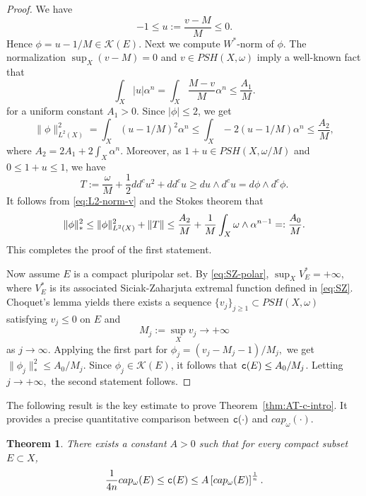 \documentclass{amsart}
\newcommand{\al}{\alpha}
\newcommand{\om}{\omega}
\newcommand{\tc}{{\tt c}}
\newcommand{\cali}[1]{\mathscr{#1}}
\newcommand{\Kc}{\cali{K}}
\newtheorem{thm}{Theorem}
\theoremstyle{definition}
\numberwithin{thm}{section}
\numberwithin{equation}{section}
\renewcommand{\[}{\begin{equation}}
\renewcommand{\]}{\end{equation}}
\newcommand{\wed}{\wedge}
\begin{document}
\begin{proof}  We have
$$
 	-1 \leq u:= \frac{v- M}{M}  \leq 0.
$$
Hence $\phi = u - 1/M \in \Kc(E)$.  Next we compute $W^*$-norm of $\phi$.  The normalization $\sup_X (v-M)  =0$ and $v\in PSH(X,\om)$ imply  a well-known fact that 
$$
	\int_X |u| \al^n = \int_X \frac{M-v}{M} \al^n\leq \frac{A_1}{M}.
$$
for a uniform constant $A_1>0$. 
Since $|\phi| \leq 2$, we get
\[\label{eq:L2-norm-v}
\|\phi\|_{L^2(X)}^2 =	\int_X (u -1/M)^2 \al^n \leq \int_X -2(u-1/M) \al^n \leq  \frac{A_2}{M},
\]
where $A_2 =  2A_1 +2 \int_X\al^n.$
 Moreover, as $1+u \in PSH(X,\om/M)$ and $0\leq 1+ u \leq 1$, we have
$$
	T := \frac{\om}{M} + \frac{1}{2} dd^c u^2 + dd^c u \geq du \wed d^c u = d \phi \wed d^c \phi. 
$$
It follows from \eqref{eq:L2-norm-v} and the Stokes theorem that 
\[\notag
	\|\phi\|_*^2 \leq \|\phi\|_{L^2(X)}^2 + \|T\| \leq  \frac{A_2}{M} + \frac{1}{M}  \int_X \om \wed \al^{n-1} =:\frac{A_0}{M}.
\]
This completes the proof of the first statement.

Now assume $E$ is a compact pluripolar set. By \eqref{eq:SZ-polar}, $\sup_X V_E^*= +\infty$, where $V_E^*$ is its associated Siciak-Zaharjuta extremal function defined in \eqref{eq:SZ}. Choquet's lemma yields there exists a sequence $\{v_j\}_{j\geq 1} \subset PSH(X,\om)$ satisfying $v_j \leq 0$ on $E$ and 
$$
	M_j:=\sup_X v_j \to +\infty 
$$ 
as $j\to \infty$. Applying the first part for $\phi_j = (v_j - M_j - 1)/M_j,$ we get  $\|\phi_j\|_*^2 \leq A_0/M_j$. Since $\phi_j \in \Kc(E)$,
it follows that $\tc (E) \leq A_0/M_j$. Letting $j\to +\infty,$ the second statement follows.
\end{proof}

The following result is the key estimate to prove Theorem~\ref{thm:AT-c-intro}. It provides a precise quantitative comparison between  $\tc(\cdot)$ and $cap_\om(\cdot)$. 

\begin{thm}\label{thm:Vigny} There exists a constant $A>0$ such that for every compact   subset $E\subset X$, 
$$
	\frac{1}{4n} cap_\om(E) \leq \tc(E) \leq A \left[cap_\om(E) \right]^\frac{1}{n}.
$$
\end{thm}
\end{document}
